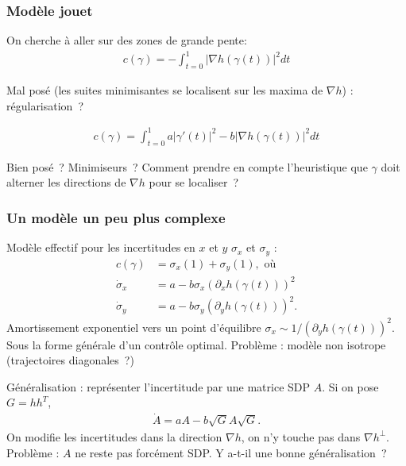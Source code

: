 \documentclass[11pt]{beamer}
\begin{document}
\begin{frame}
  \frametitle{Modèle jouet}
  On cherche à aller sur des zones de grande pente:
  \begin{align*}
    c(\gamma) = -\int_{t=0}^{1} |\nabla h(\gamma(t))|^{2}  dt
  \end{align*}

  Mal posé (les suites minimisantes se localisent sur les maxima de
  $\nabla h$) : régularisation~?
  
\begin{align*}
  c(\gamma) =  \int_{t=0}^{1} a |\gamma'(t)|^{2} - b |\nabla
  h(\gamma(t))|^{2} dt
\end{align*}

Bien posé~? Minimiseurs~? Comment prendre en compte l'heuristique que
$\gamma$ doit alterner les directions de $\nabla h$ pour se localiser~?


\end{frame}
\begin{frame}
  \frametitle{Un modèle un peu plus complexe}
Modèle effectif pour les incertitudes en $x$ et $y$ $\sigma_{x}$ et
$\sigma_{y}$ :
\begin{align*}
  c(\gamma) &= \sigma_{x}(1) + \sigma_{y}(1), \text{ où}\\
  \dot \sigma_{x} &= a - b \sigma_{x} (\partial_{x} h(\gamma(t)))^{2}\\
  \dot \sigma_{y} &= a - b \sigma_{y} (\partial_{y} h(\gamma(t)))^{2}.
\end{align*}
Amortissement exponentiel vers un point d'équilibre $\sigma_{x} \sim
1/(\partial_{y} h(\gamma(t)))^{2}$. Sous la forme générale d'un
contrôle optimal. Problème : modèle non isotrope (trajectoires
diagonales~?)

Généralisation : représenter l'incertitude par une matrice SDP $A$. Si
on pose $G = h h^{T}$,
\begin{align*}
  \dot A = a A - b \sqrt G A \sqrt G.
\end{align*}
On modifie les incertitudes dans la direction $\nabla h$, on n'y
touche pas dans $\nabla h^{\perp}$. Problème : $A$ ne reste
pas forcément SDP. Y a-t-il une bonne généralisation~?
\end{frame}
\end{document}
